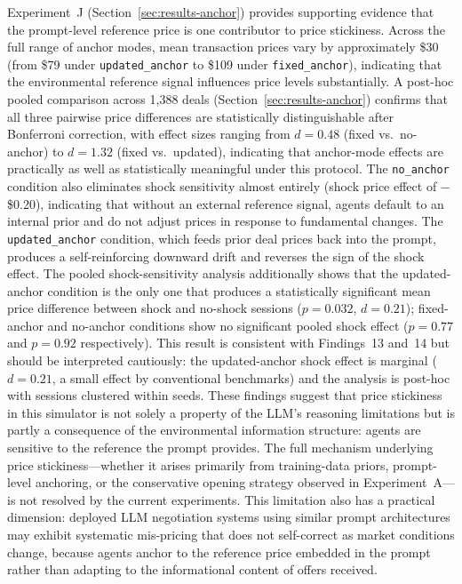 Experiment~J (Section~\ref{sec:results-anchor}) provides supporting evidence that the prompt-level reference price is one contributor to price stickiness.  Across the full range of anchor modes, mean transaction prices vary by approximately \$30 (from \$79 under \texttt{updated\_anchor} to \$109 under \texttt{fixed\_anchor}), indicating that the environmental reference signal influences price levels substantially.  A post-hoc pooled comparison across 1{,}388 deals (Section~\ref{sec:results-anchor}) confirms that all three pairwise price differences are statistically distinguishable after Bonferroni correction, with effect sizes ranging from $d = 0.48$ (fixed vs.\ no-anchor) to $d = 1.32$ (fixed vs.\ updated), indicating that anchor-mode effects are practically as well as statistically meaningful under this protocol.  The \texttt{no\_anchor} condition also eliminates shock sensitivity almost entirely (shock price effect of $-$\$0.20), indicating that without an external reference signal, agents default to an internal prior and do not adjust prices in response to fundamental changes.  The \texttt{updated\_anchor} condition, which feeds prior deal prices back into the prompt, produces a self-reinforcing downward drift and reverses the sign of the shock effect.  The pooled shock-sensitivity analysis additionally shows that the updated-anchor condition is the only one that produces a statistically significant mean price difference between shock and no-shock sessions ($p = 0.032$, $d = 0.21$); fixed-anchor and no-anchor conditions show no significant pooled shock effect ($p = 0.77$ and $p = 0.92$ respectively).  This result is consistent with Findings~13 and~14 but should be interpreted cautiously: the updated-anchor shock effect is marginal ($d = 0.21$, a small effect by conventional benchmarks) and the analysis is post-hoc with sessions clustered within seeds.  These findings suggest that price stickiness in this simulator is not solely a property of the LLM's reasoning limitations but is partly a consequence of the environmental information structure: agents are sensitive to the reference the prompt provides.  The full mechanism underlying price stickiness---whether it arises primarily from training-data priors, prompt-level anchoring, or the conservative opening strategy observed in Experiment~A---is not resolved by the current experiments.  This limitation also has a practical dimension: deployed LLM negotiation systems using similar prompt architectures may exhibit systematic mis-pricing that does not self-correct as market conditions change, because agents anchor to the reference price embedded in the prompt rather than adapting to the informational content of offers received.


